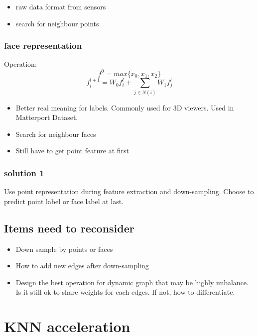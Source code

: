 \documentclass[,table,dvipsnames]{article}
\begin{document}
\begin{itemize}
	\item raw data format from sensors
	\item search for neighbour points
\end{itemize}

\subsubsection{face representation}
Operation:
$$f^0 = max\{x_0, x_1, x_2\}$$
$$f_i^{l+1} = W_0f_i^l + \sum_{j\in N(i)}W_1 f_j^l$$
\par \noindent

\begin{itemize}
	\item Better real meaning for labels. Commonly used for 3D viewers. Used in Matterport Dataset.
	\item Search for neighbour faces
	\item Still have to get point feature at first
\end{itemize}

\subsubsection{solution 1}
Use point representation during feature extraction and down-sampling. Choose to predict point label or face label at last. 

\subsection{Items need to reconsider}
\begin{itemize}
	\item Down sample by points or faces
	\item How to add new edges after down-sampling
	\item Design the best operation for dynamic graph that may be highly unbalance. Is it still ok to share weights for each edges. If not, how to differentiate.
\end{itemize}

\section{KNN acceleration}
\end{document}
